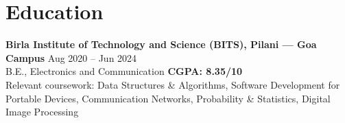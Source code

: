 \documentclass[10pt]{article}
\begin{document}
\section{Education}
\textbf{Birla Institute of Technology and Science (BITS), Pilani --- Goa Campus} \hfill Aug 2020 -- Jun 2024 \\
B.E., Electronics and Communication \hfill \textbf{CGPA: 8.35/10} \\
Relevant coursework: Data Structures \& Algorithms, Software Development for Portable Devices, Communication Networks, Probability \& Statistics, Digital Image Processing
\end{document}
